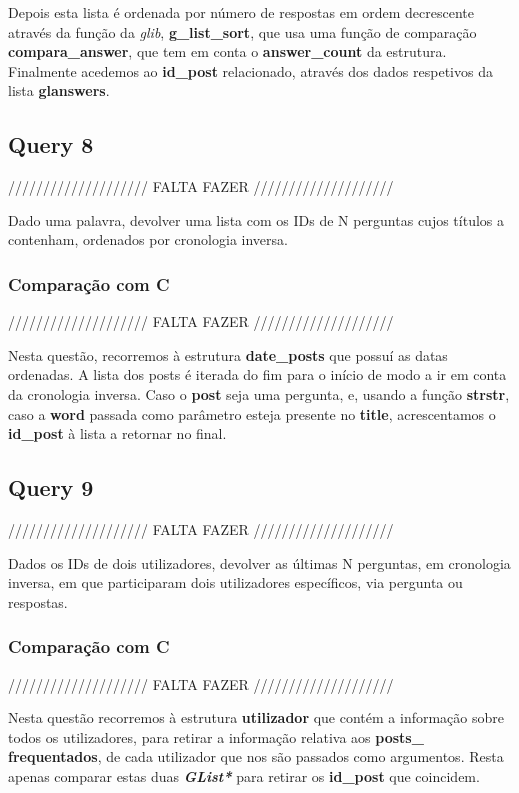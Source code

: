 \documentclass[a4paper]{article}
\begin{document}
Depois esta lista é ordenada por número de respostas em ordem decrescente
através da função da \textit{glib}, \textbf{g\_list\_sort}, que usa uma 
função de comparação \textbf{compara\_answer}, que tem em conta o 
\textbf{answer\_count} da estrutura. Finalmente acedemos ao \textbf{id\_post}
relacionado, através dos dados respetivos da lista \textbf{glanswers}.

\subsection{Query 8}

//////////////////// FALTA FAZER ////////////////////

Dado uma palavra, devolver uma lista com os IDs de N perguntas
cujos títulos a contenham, ordenados por cronologia inversa.

\subsubsection{Comparação com C}

//////////////////// FALTA FAZER ////////////////////

Nesta questão, recorremos à estrutura \textbf{date\_posts} que possuí 
as datas ordenadas. A lista dos posts é iterada do fim para o início
de modo a ir em conta da cronologia inversa. Caso o \textbf{post} seja 
uma pergunta, e, usando a função \textbf{strstr}, caso a \textbf{word}
passada como parâmetro esteja presente no \textbf{title}, acrescentamos
o \textbf{id\_post} à lista a retornar no final.

\subsection{Query 9}

//////////////////// FALTA FAZER ////////////////////

Dados os IDs de dois utilizadores, devolver as últimas N perguntas, em
cronologia inversa, em que participaram dois utilizadores específicos, 
via pergunta ou respostas.

\subsubsection{Comparação com C}

//////////////////// FALTA FAZER ////////////////////

Nesta questão recorremos à estrutura \textbf{utilizador} que contém a 
informação sobre todos os utilizadores, para retirar a informação relativa 
aos \textbf{posts\_} \textbf{frequentados}, de cada utilizador que nos são 
passados como argumentos. Resta apenas comparar estas duas 
\textit{\textbf{GList*}} para retirar os \textbf{id\_post} que coincidem.
\end{document}
